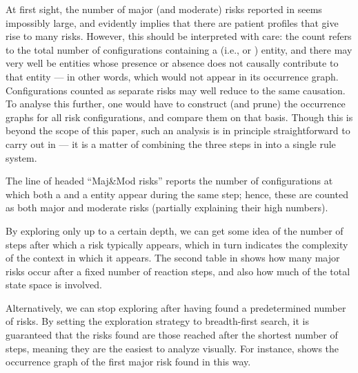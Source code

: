 At first sight, the number of major (and moderate) risks reported in  seems impossibly large, and evidently implies that there are patient profiles that give rise to many risks. However, this should be interpreted with care: the count refers to the total number of configurations containing a \Forbidden (i.e., \major or \minor) entity, and there may very well be entities whose presence or absence does not causally contribute to that \Forbidden entity --- in other words, which would not appear in its occurrence graph. Configurations counted as separate risks may well reduce to the same causation. To analyse this further, one would have to construct (and prune) the occurrence graphs for all risk configurations, and compare them on that basis. Though this is beyond the scope of this paper, such an analysis is in principle straightforward to carry out in \GROOVE --- it is a matter of combining the three steps in  into a single rule system.

The line of  headed ``Maj\&Mod risks'' reports the number of configurations at which both a \major and a \moderate entity appear during the same step; hence, these are counted as both major and moderate risks (partially explaining their high numbers).
 
\medskip\noindent By exploring only up to a certain depth, we can get some idea of the number of steps after which a risk typically appears, which in turn indicates the complexity of the context in which it appears. The second table in  shows how many major risks occur after a fixed number of reaction steps, and also how much of the total state space is involved.

\medskip\noindent Alternatively, we can stop exploring after having found a predetermined number of risks. By setting the exploration strategy to breadth-first search, it is guaranteed that the risks found are those reached after the shortest number of steps, meaning they are the easiest to analyze visually. For instance,  shows the occurrence graph of the first major risk found in this way.

